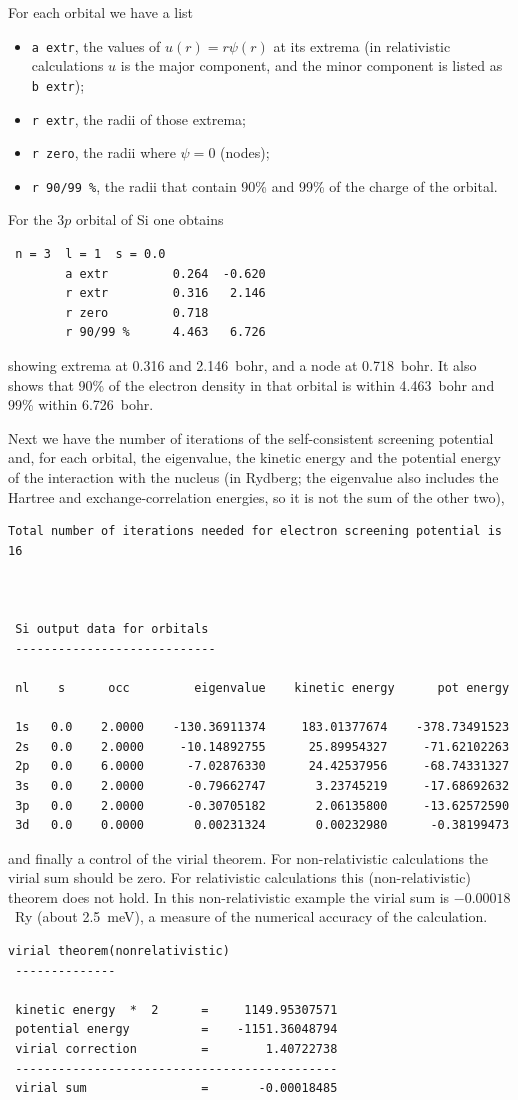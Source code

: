 \documentclass[11pt]{article}
\begin{document}
For each orbital we have a list
\begin{itemize}
\item \texttt{a extr}, the values of $u(r) = r\psi(r)$ at its extrema (in relativistic
calculations $u$ is the major component, and the minor component is listed as \texttt{b extr});
\item \texttt{r extr}, the radii of those extrema;
\item \texttt{r zero}, the radii where $\psi = 0$ (nodes);
\item \texttt{r 90/99 \%}, the radii that contain 90\% and 99\% of the charge of the orbital.
\end{itemize}
For the $3p$ orbital of Si one obtains
\begin{verbatim}
 n = 3  l = 1  s = 0.0
        a extr         0.264  -0.620
        r extr         0.316   2.146
        r zero         0.718
        r 90/99 %      4.463   6.726
\end{verbatim}
showing extrema at 0.316 and 2.146~bohr, and a node at 0.718~bohr.  It also shows that
90\% of the electron density in that orbital is within 4.463~bohr and 99\% within 6.726~bohr.

Next we have the number of iterations of the self-consistent screening potential and,
for each orbital, the eigenvalue, the kinetic energy and the potential energy of
the interaction with the nucleus (in Rydberg; the eigenvalue also includes the Hartree
and exchange-correlation energies, so it is not the sum of the other two),
\begin{verbatim}
Total number of iterations needed for electron screening potential is 16
 


 Si output data for orbitals
 ----------------------------

 nl    s      occ         eigenvalue    kinetic energy      pot energy

 1s   0.0    2.0000    -130.36911374     183.01377674    -378.73491523
 2s   0.0    2.0000     -10.14892755      25.89954327     -71.62102263
 2p   0.0    6.0000      -7.02876330      24.42537956     -68.74331327
 3s   0.0    2.0000      -0.79662747       3.23745219     -17.68692632
 3p   0.0    2.0000      -0.30705182       2.06135800     -13.62572590
 3d   0.0    0.0000       0.00231324       0.00232980      -0.38199473
\end{verbatim}
and finally a control of the virial theorem.  For non-relativistic
calculations the virial sum should be zero.  For relativistic
calculations this (non-relativistic) theorem does not hold.  In this non-relativistic
example the virial sum is $-0.00018$~Ry (about 2.5~meV), a measure of the numerical accuracy
of the calculation.
\begin{verbatim}
virial theorem(nonrelativistic)
 --------------

 kinetic energy  *  2      =     1149.95307571
 potential energy          =    -1151.36048794
 virial correction         =        1.40722738
 ---------------------------------------------
 virial sum                =       -0.00018485
\end{verbatim}
\end{document}
